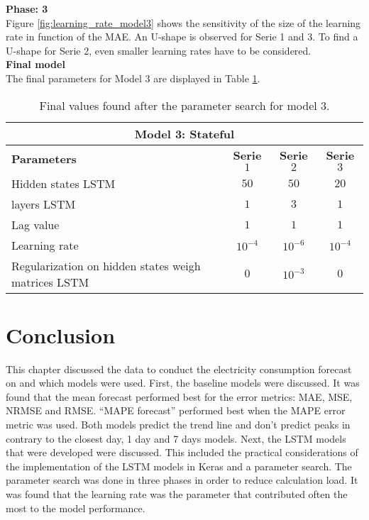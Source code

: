 \textbf{Phase: 3}\\
Figure \ref{fig:learning_rate_model3} shows the sensitivity of the size of the learning rate in function of the MAE. An U-shape is observed for Serie 1 and 3. To find a U-shape for Serie 2, even smaller learning rates have to be considered.\\

\textbf{Final model}\\
The final parameters for Model 3 are displayed in Table \ref{tab:final_model3}.

\begin{table}[h!]
	\centering
	\begin{tabular}{@{}l|ccc@{}} \toprule
		\multicolumn{4}{c}{Model 3: Stateful}\\\midrule\midrule
		\textbf{Parameters}	& \textbf{Serie $ 1 $} & \textbf{Serie $ 2 $} & \textbf{Serie $ 3 $}\\\midrule
		Hidden states LSTM & $50 $&$ 50 $  & $20 $\\
		layers LSTM & $1 $&$ 3 $  & $1$\\
		Lag value & $1 $&$ 1$  & $1$\\
		Learning rate & $10^{-4} $&$10^{-6} $  & $10^{-4} $\\\hline
		Regularization on hidden states weigh matrices LSTM  & $ 0 $ & $ 10^{-3} $ & $ 0 $\\\bottomrule
	\end{tabular}
	\caption{Final values found after the parameter search for model 3.}
	\label{tab:final_model3}
\end{table}


\section{Conclusion}
This chapter discussed the data to conduct the electricity consumption forecast on and which models were used. First, the baseline models were discussed. It was found that the mean forecast performed best for the error metrics: MAE, MSE, NRMSE and RMSE. ``MAPE forecast'' performed best when the MAPE error metric was used. Both models predict the trend line and don't predict peaks in contrary to the closest day, 1 day and 7 days models. Next, the LSTM models that were developed were discussed. This included the practical considerations of the implementation of the LSTM models in Keras and a parameter search. The parameter search was done in three phases in order to reduce calculation load. It was found that the learning rate was the parameter that contributed often the most to the model performance.


